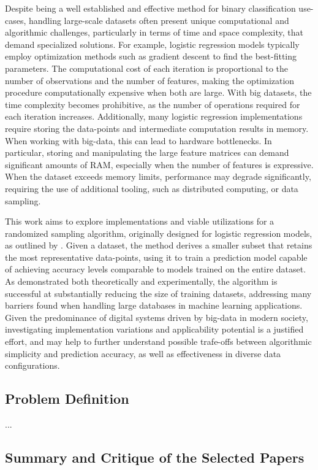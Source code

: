 \documentclass{article}
\theoremstyle{plain}
\theoremstyle{definition}
\theoremstyle{remark}
\begin{document}
Despite being a well established and effective method for binary classification use-cases, handling large-scale datasets often present unique computational and algorithmic challenges, particularly in terms of time and space complexity, that demand specialized solutions. For example, logistic regression models typically employ optimization methods such as gradient descent to find the best-fitting parameters. The computational cost of each iteration is proportional to the number of observations and the number of features, making the optimization procedure computationally expensive when both are large. With big datasets, the time complexity becomes prohibitive, as the number of operations required for each iteration increases. Additionally, many logistic regression implementations require storing the data-points and intermediate computation results in memory. When working with big-data, this can lead to hardware bottlenecks. In particular, storing and manipulating the large feature matrices can demand significant amounts of RAM, especially when the number of features is expressive. When the dataset exceeds memory limits, performance may degrade significantly, requiring the use of additional tooling, such as distributed computing, or data sampling.

This work aims to explore implementations and viable utilizations for a randomized sampling algorithm, originally designed for logistic regression models, as outlined by \citet{chow24}. Given a dataset, the method derives a smaller subset that retains the most representative data-points, using it to train a prediction model capable of achieving accuracy levels comparable to models trained on the entire dataset. As demonstrated both theoretically and experimentally, the algorithm is successful at substantially reducing the size of training datasets, addressing many barriers found when handling large databases in machine learning applications. Given the predominance of digital systems driven by big-data in modern society, investigating implementation variations and applicability potential is a justified effort, and may help to further understand possible trafe-offs between algorithmic simplicity and prediction accuracy, as well as effectiveness in diverse data configurations.

\subsection{Problem Definition}
...

\subsection{Summary and Critique of the Selected Papers}
\end{document}
